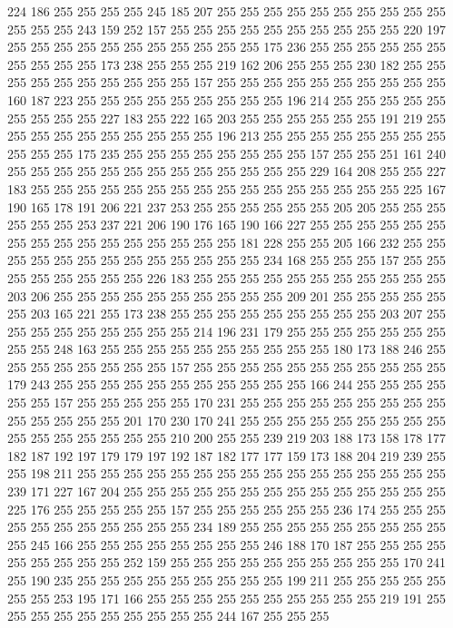 224 186 255 255 255 255 245 185 207 255 255 255 255 255 255 255 255 255 255 255
255 255 243 159 252 157 255 255 255 255 255 255 255 255 255 255 220 197 255 255
255 255 255 255 255 255 255 255 255 175 236 255 255 255 255 255 255 255 255 255
255 173 238 255 255 255 219 162 206 255 255 255 230 182 255 255 255 255 255 255
255 255 255 255 157 255 255 255 255 255 255 255 255 255 255 160 187 223 255 255
255 255 255 255 255 255 255 196 214 255 255 255 255 255 255 255 255 255 227 183
255 222 165 203 255 255 255 255 255 255 191 219 255 255 255 255 255 255 255 255
255 255 196 213 255 255 255 255 255 255 255 255 255 255 255 175 235 255 255 255
255 255 255 255 255 157 255 255 251 161 240 255 255 255 255 255 255 255 255 255
255 255 255 255 229 164 208 255 255 227 183 255 255 255 255 255 255 255 255 255
255 255 255 255 255 255 255 225 167 190 165 178 191 206 221 237 253 255 255 255
255 255 255 205 205 255 255 255 255 255 255 253 237 221 206 190 176 165 190 166
227 255 255 255 255 255 255 255 255 255 255 255 255 255 255 255 255 181 228 255
255 205 166 232 255 255 255 255 255 255 255 255 255 255 255 255 255 234 168 255
255 255 157 255 255 255 255 255 255 255 255 226 183 255 255 255 255 255 255 255
255 255 255 255 203 206 255 255 255 255 255 255 255 255 255 255 209 201 255 255
255 255 255 255 203 165 221 255 173 238 255 255 255 255 255 255 255 255 255 203
207 255 255 255 255 255 255 255 255 255 214 196 231 179 255 255 255 255 255 255
255 255 255 248 163 255 255 255 255 255 255 255 255 255 255 180 173 188 246 255
255 255 255 255 255 255 255 157 255 255 255 255 255 255 255 255 255 255 255 179
243 255 255 255 255 255 255 255 255 255 255 255 166 244 255 255 255 255 255 255
157 255 255 255 255 255 170 231 255 255 255 255 255 255 255 255 255 255 255 255
255 255 201 170 230 170 241 255 255 255 255 255 255 255 255 255 255 255 255 255
255 255 255 210 200 255 255 239 219 203 188 173 158 178 177 182 187 192 197 179
179 197 192 187 182 177 177 159 173 188 204 219 239 255 255 198 211 255 255 255
255 255 255 255 255 255 255 255 255 255 255 255 255 239 171 227 167 204 255 255
255 255 255 255 255 255 255 255 255 255 255 255 225 176 255 255 255 255 255 157
255 255 255 255 255 255 236 174 255 255 255 255 255 255 255 255 255 255 255 234
189 255 255 255 255 255 255 255 255 255 255 245 166 255 255 255 255 255 255 255
255 246 188 170 187 255 255 255 255 255 255 255 255 255 252 159 255 255 255 255
255 255 255 255 255 255 170 241 255 190 235 255 255 255 255 255 255 255 255 255
199 211 255 255 255 255 255 255 255 253 195 171 166 255 255 255 255 255 255 255
255 255 255 219 191 255 255 255 255 255 255 255 255 255 255 244 167 255 255 255
